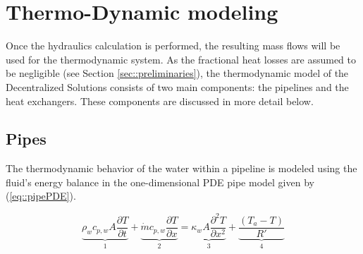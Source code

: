 


\section{Thermo-Dynamic modeling}\label{sec::thermo}
Once the hydraulics calculation is performed, the resulting mass flows will be used for the thermodynamic system. As the fractional heat losses are assumed to be negligible (see Section \ref{sec::preliminaries}), the thermodynamic model of the Decentralized Solutions consists of two main components: the pipelines and the heat exchangers. These components are discussed in more detail below. 

\subsection{Pipes}\label{sec::thermopipes}
The thermodynamic behavior of the water within a pipeline is modeled using the fluid's energy balance in the one-dimensional PDE pipe model given by (\ref{eq::pipePDE}).

\begin{equation}\label{eq::pipePDE}
\underbrace{\rho_w c_{p,w} A \frac{\partial T}{\partial t}}_1+\underbrace{\dot{m} c_{p,w} \frac{\partial T}{\partial x}}_2=\underbrace{\kappa_w A \frac{\partial^2 T}{\partial x^2}}_3+\underbrace{\frac{\left(T_a-T\right)}{R'}}_4
\end{equation}

